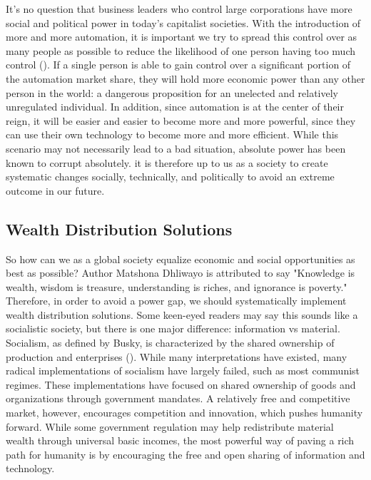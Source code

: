 It's no question that business leaders who control large corporations have more social and political power in today's capitalist societies. With the introduction of more and more automation, it is important we try to spread this control over as many people as possible to reduce the likelihood of one person having too much control (\cite{WhatsWrongWithWealthDistribution}). If a single person is able to gain control over a significant portion of the automation market share, they will hold more economic power than any other person in the world: a dangerous proposition for an unelected and relatively unregulated individual. In addition, since automation is at the center of their reign, it will be easier and easier to become more and more powerful, since they can use their own technology to become more and more efficient. While this scenario may not necessarily lead to a bad situation, absolute power has been known to corrupt absolutely. it is therefore up to us as a society to create systematic changes socially, technically, and politically to avoid an extreme outcome in our future.

\subsection{Wealth Distribution Solutions}

So how can we as a global society equalize economic and social opportunities as best as possible? Author Matshona Dhliwayo is attributed to say "Knowledge is wealth, wisdom is treasure, understanding is riches, and ignorance is poverty." Therefore, in order to avoid a power gap, we should systematically implement wealth distribution solutions. Some keen-eyed readers may say this sounds like a socialistic society, but there is one major difference: information vs material. Socialism, as defined by Busky, is characterized by the shared ownership of production and enterprises (\cite{WhatIsSocialism}). While many interpretations have existed, many radical implementations of socialism have largely failed, such as most communist regimes. These implementations have focused on shared ownership of goods and organizations through government mandates. A relatively free and competitive market, however, encourages competition and innovation, which pushes humanity forward. While some government regulation may help redistribute material wealth through universal basic incomes, the most powerful way of paving a rich path for humanity is by encouraging the free and open sharing of information and technology.

